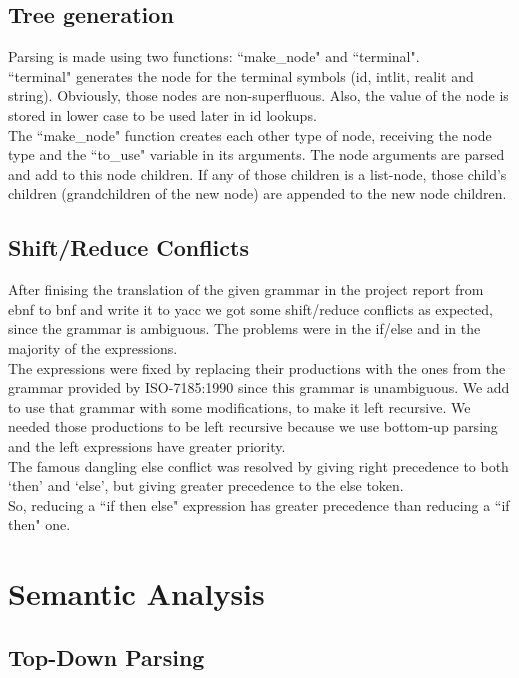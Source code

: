 \documentclass[12pt]{article}
\begin{document}
\subsection{Tree generation}

Parsing is made using two functions: ``make\_node" and ``terminal". \\
``terminal" generates the node for the terminal symbols (id, intlit, realit and string). Obviously, those nodes are non-superfluous. Also, the value of the node is stored in lower case to be used later in id lookups.\\
The ``make\_node" function creates each other type of node, receiving the node type and the ``to\_use" variable in its arguments. The node arguments are parsed and add to this node children. If any of those children is a list-node, those child's children (grandchildren of the new node) are appended to the new node children.\\

\subsection{Shift/Reduce Conflicts}

After finising the translation of the given grammar in the project report from ebnf to bnf and write it to yacc we got some shift/reduce conflicts as expected, since the grammar is ambiguous. The problems were in the if/else and in the majority of the expressions. \\
The expressions were fixed by replacing their productions with the ones from the grammar provided by ISO-7185:1990 since this grammar is unambiguous. We add to use that grammar with some modifications, to make it left recursive. We needed those productions to be left recursive because we use bottom-up parsing and the left expressions have greater priority.\\
The famous dangling else conflict was resolved by giving right precedence to both `then' and `else', but giving greater precedence to the else token. \\
So, reducing a ``if then else" expression has greater precedence than reducing a ``if then" one. \\


\section{Semantic Analysis}

\subsection{Top-Down Parsing}
\end{document}
